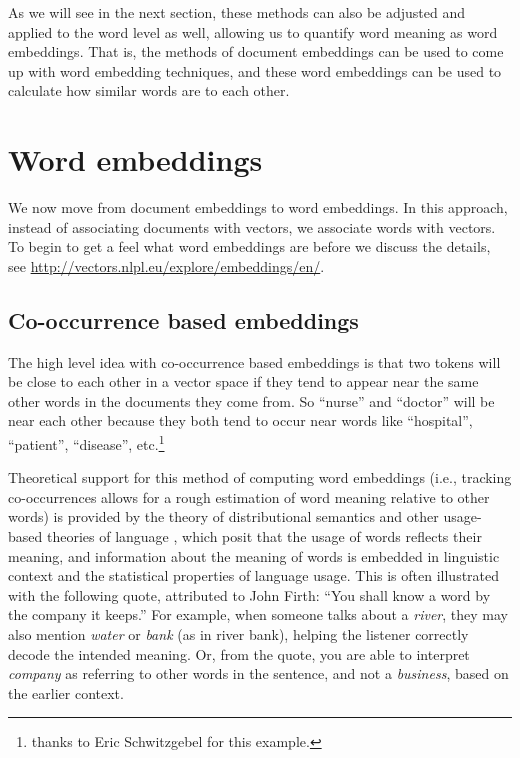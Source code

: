 As we will see in the next section, these methods can also be adjusted and applied to the word level as well, allowing us to quantify word meaning as word embeddings. That is, the methods of document embeddings can be used to come up with word embedding techniques, and these word embeddings can be used to calculate how similar words are to each other.

\section{Word embeddings}

We now move from document embeddings to word embeddings. In this approach, instead of associating documents with vectors, we associate words with vectors. To begin to get a feel what word embeddings are before we discuss the details, see \url{http://vectors.nlpl.eu/explore/embeddings/en/}. 

\subsection{Co-occurrence based embeddings}

The high level idea with co-occurrence based embeddings is that two tokens will be close to each other in a vector space if they tend to appear near the same other words in the documents they come from.  So ``nurse'' and ``doctor'' will be near each other because they both tend to occur near words like ``hospital'', ``patient'', ``disease'', etc.\footnote{thanks to Eric Schwitzgebel for this example.}

Theoretical support for this method of computing word embeddings (i.e., tracking co-occurrences allows for a rough estimation of word meaning relative to other words) is provided by the theory of distributional semantics \cite{harris1954distributional, firth1957synopsis} and other usage-based theories of language \cite{wittgenstein1953philosophical}, which posit that the usage of words reflects their meaning, and information about the meaning of words is embedded in linguistic context and the statistical properties of language usage. This is often illustrated with the following quote, attributed to John Firth: ``You shall know a word by the company it keeps.'' For example, when someone talks about a \textit{river}, they may also mention \textit{water} or \textit{bank} (as in river bank), helping the listener correctly decode the intended meaning. Or, from the quote, you are able to interpret \textit{company} as referring to other words in the sentence, and not a \textit{business}, based on the earlier context.

